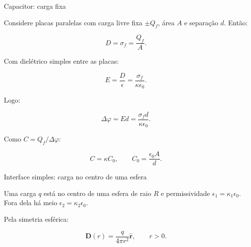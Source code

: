 \documentclass[aspectratio=169]{beamer}
\begin{document}
\begin{frame}{Capacitor: carga fixa}

\footnotesize

Considere placas paralelas com carga livre fixa \(\pm Q_f\), área \(A\) e
separação \(d\). Então:

\[
D=\sigma_f=\frac{Q_f}{A}.
\]

Com dielétrico simples entre as placas:

\[
E=\frac{D}{\epsilon}=\frac{\sigma_f}{\kappa\epsilon_0}.
\]

Logo:

\begin{eqbox}
\begin{equation}
\Delta\varphi
=
Ed
=
\frac{\sigma_f d}{\kappa\epsilon_0}.
\tag{6.48}
\end{equation}
\end{eqbox}

Como \(C=Q_f/\Delta\varphi\):

\begin{eqbox}
\begin{equation}
C=\kappa C_0,
\qquad
C_0=\frac{\epsilon_0 A}{d}.
\tag{6.52}
\end{equation}
\end{eqbox}

\end{frame}

\begin{frame}{Interface simples: carga no centro de uma esfera}

\small

Uma carga \(q\) está no centro de uma esfera de raio \(R\) e permissividade
\(\epsilon_1=\kappa_1\epsilon_0\). Fora dela há meio \(\epsilon_2=\kappa_2\epsilon_0\).

\begin{center}
\end{center}

Pela simetria esférica:

\begin{eqbox}
\begin{equation}
\mathbf D(r)
=
\frac{q}{4\pi r^2}\hat{\mathbf r},
\qquad r>0.
\tag{6.53}
\end{equation}
\end{eqbox}

\end{frame}
\end{document}
